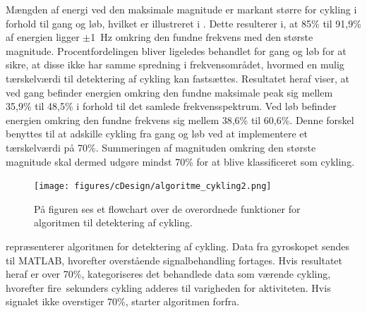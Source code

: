 Mængden af energi ved den maksimale magnitude er markant større for cykling i forhold til gang og løb, hvilket er illustreret i . Dette resulterer i, at 85\% til 91,9\% af energien ligger $\pm$1~Hz omkring den fundne frekvens med den største magnitude. Procentfordelingen bliver ligeledes behandlet for gang og løb for at sikre, at disse ikke har samme spredning i frekvensområdet, hvormed en mulig tærskelværdi til detektering af cykling kan fastsættes. Resultatet heraf viser, at ved gang befinder energien omkring den fundne maksimale peak sig mellem 35,9\% til 48,5\% i forhold til det samlede frekvensspektrum. Ved løb befinder energien omkring den fundne frekvens sig mellem 38,6\% til 60,6\%. Denne forskel benyttes til at adskille cykling fra gang og løb ved at implementere et tærskelværdi på 70\%. Summeringen af magnituden omkring den største magnitude skal dermed udgøre mindst 70\% for at blive klassificeret som cykling. 
\begin{figure}[H]
	\centering
	\texttt{[image: figures/cDesign/algoritme\_cykling2.png]}
	\caption{På figuren ses et flowchart over de overordnede funktioner for algoritmen til detektering af cykling.}
	\label{fig:algoritme_cykling}
\end{figure}\vspace{-0.25cm}
 repræsenterer algoritmen for detektering af cykling. Data fra gyroskopet sendes til MATLAB, hvorefter overstående signalbehandling fortages. Hvis resultatet heraf er over 70\%, kategoriseres det behandlede data som værende cykling, hvorefter fire~sekunders cykling adderes til varigheden for aktiviteten. Hvis signalet ikke overstiger 70\%, starter algoritmen forfra.

